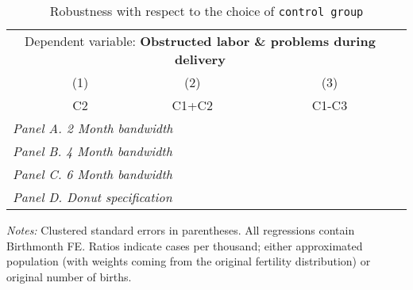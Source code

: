  \begin{table}[H] \begin{threeparttable} \centering \caption{Robustness with respect to the choice of \texttt{control group}} {\def\sym#1{\ifmmode^{#1}\else\(^{#1}\)\fi} \begin{tabular}{l*{4}{c}} \toprule \multicolumn{4}{c}{Dependent variable: \textbf{Obstructed labor \& problems during delivery}} \\ \cmidrule(lr){2-4}
            &\multicolumn{1}{c}{(1)}&\multicolumn{1}{c}{(2)}&\multicolumn{1}{c}{(3)}\\
            &\multicolumn{1}{c}{C2}&\multicolumn{1}{c}{C1+C2}&\multicolumn{1}{c}{C1-C3}\\
\midrule
 \multicolumn{4}{l}{\emph{Panel A. 2 Month bandwidth}} \\    \midrule\multicolumn{4}{l}{\emph{Panel B. 4 Month bandwidth}} \\    \midrule\multicolumn{4}{l}{\emph{Panel C. 6 Month bandwidth}} \\    \midrule\multicolumn{4}{l}{\emph{Panel D. Donut specification}} \\    
\bottomrule \end{tabular} } \begin{tablenotes} \item \scriptsize \emph{Notes:} Clustered standard errors in parentheses. All regressions contain Birthmonth FE. Ratios indicate cases per thousand; either approximated population (with weights coming from the original fertility distribution) or original number of births. \end{tablenotes} \end{threeparttable} \end{table} 
